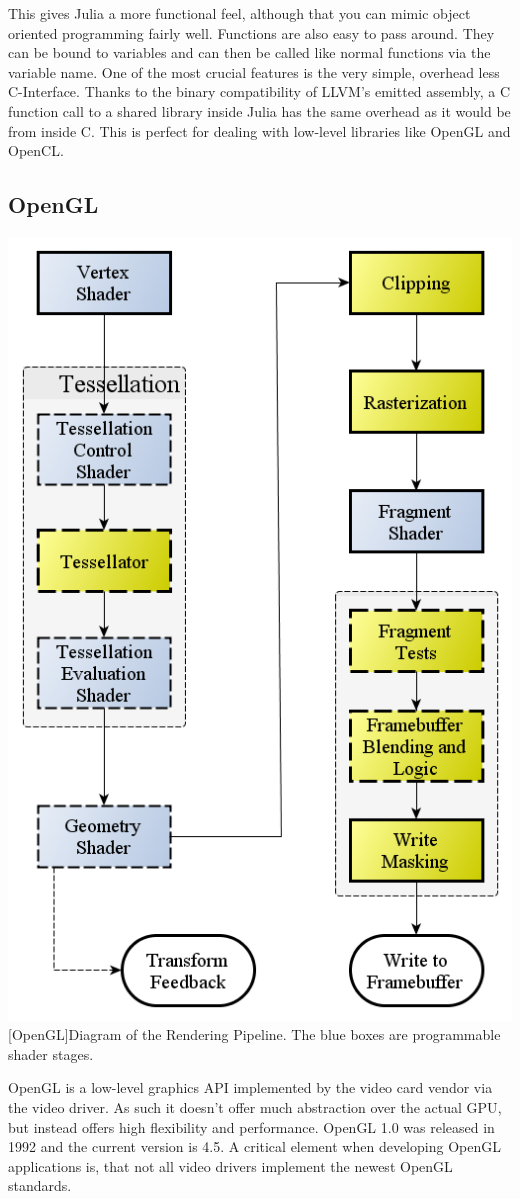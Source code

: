 This gives Julia a more functional feel, although that you can mimic object oriented programming fairly well.
Functions are also easy to pass around. They can be bound to variables and can then be called like normal functions via the variable name.
One of the most crucial features is the very simple, overhead less C-Interface. 
Thanks to the binary compatibility of LLVM's emitted assembly, a C function call to a shared library inside Julia has the same overhead as it would be from inside C\cite{CCALL}. 
This is perfect for dealing with low-level libraries like \ac{OpenGL} and \ac{OpenCL}.


\subsection{\ac{OpenGL}}

\vspace{1em}
\begin{minipage}{\linewidth}
    \centering
    \includegraphics[width=0.5\linewidth]{graphics/RenderingPipeline.png}
    [OpenGL]{Diagram of the Rendering Pipeline. The blue boxes are programmable shader stages. \cite{OpenGLPipeline}}
    \label{fig:opengl}
\end{minipage}


\ac{OpenGL} is a low-level graphics API implemented by the video card vendor via the video driver. 
As such it doesn't offer much abstraction over the actual \ac{GPU}, but instead offers high flexibility and performance.
\ac{OpenGL} 1.0 was released in 1992 and the current version is 4.5.
A critical element when developing \ac{OpenGL} applications is, that not all video drivers implement the newest \ac{OpenGL} standards.

